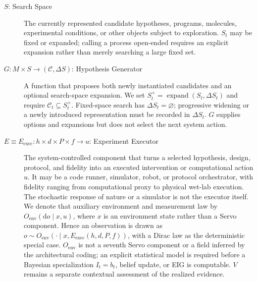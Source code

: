 \documentclass{article}
\begin{document}
\begin{description}
  \item[$S$: Search Space] The currently represented candidate hypotheses, programs, molecules, experimental conditions, or other objects subject to exploration. $S_t$ may be fixed or expanded; calling a process open-ended requires an explicit expansion rather than merely searching a large fixed set.

  \item[$G: M \times S \rightarrow (\mathcal{C},\Delta S)$: Hypothesis Generator] A function that proposes both newly instantiated candidates and an optional search-space expansion. We set $S_t^+=\operatorname{expand}(S_t,\Delta S_t)$ and require $\mathcal C_t\subseteq S_t^+$. Fixed-space search has $\Delta S_t=\varnothing$; progressive widening or a newly introduced representation must be recorded in $\Delta S_t$. $G$ supplies options and expansions but does not select the next system action.

  \item[$E\equiv E_{\mathrm{exec}}: h\times d\times P\times f\rightarrow u$: Experiment Executor]
  The system-controlled component that turns a selected hypothesis, design, protocol, and fidelity into
  an executed intervention or computational action $u$. It may be a code runner, simulator,
  robot, or protocol orchestrator, with fidelity ranging from computational proxy to physical
  wet-lab execution. The stochastic response of nature or a simulator is not the executor
  itself. We denote that auxiliary environment and measurement law by
  $O_{\mathrm{env}}(\mathrm{d}o\mid x,u)$, where $x$ is an environment state rather than a
  Servo component. Hence an observation is drawn as
  $o\sim O_{\mathrm{env}}(\cdot\mid x,E_{\mathrm{exec}}(h,d,P,f))$, with a Dirac law as the
  deterministic special case. $O_{\mathrm{env}}$ is not a seventh Servo component or a field
  inferred by the architectural coding; an explicit statistical model is required before a
  Bayesian specialization $I_t=b_t$, belief update, or EIG is computable. $V$ remains a separate contextual assessment of the
  realized evidence.


\end{description}
\end{document}

